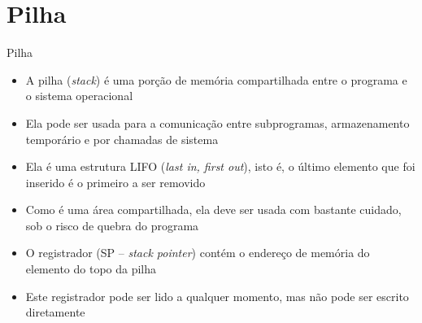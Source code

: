 \section{Pilha}

\begin{frame}[fragile]{Pilha}

    \begin{itemize}
        \item A pilha (\textit{stack}) é uma porção de memória compartilhada entre o programa e
            o sistema operacional

        \item Ela pode ser usada para a comunicação entre subprogramas, armazenamento temporário 
            e por chamadas de sistema

        \item Ela é uma estrutura LIFO (\textit{last in, first out}), isto é, o último elemento que
            foi inserido é o primeiro a ser removido

        \item Como é uma área compartilhada, ela deve ser usada com bastante cuidado, sob o risco
            de quebra do programa 

        \item O registrador  (SP -- \textit{stack pointer}) contém o endereço de                memória do elemento do topo da pilha 

        \item Este registrador pode ser lido a qualquer momento, mas não pode ser escrito 
            diretamente

    \end{itemize}

\end{frame}


